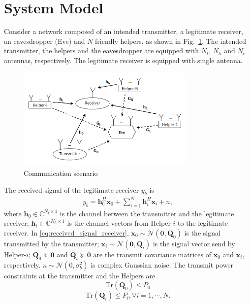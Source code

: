 \documentclass[journal]{IEEEtran}
\begin{document}
\section{System Model} \label{sec:system model}
Consider a network composed of an intended transmitter, a legitimate receiver, an eavesdropper (Eve) and $N$ friendly helpers, as shown in Fig.~\ref{fig:channel}. The intended transmitter, the helpers and the eavesdropper are equipped with $N_t$, $N_h$ and $N_e$ antennas, respectively. The legitimate receiver is equipped with single antenna. 
\begin{figure}[!htbp] 
	\centering
	\includegraphics[width=8.7cm]{channel.png} %
	\caption{Communication scenario}
	\label{fig:channel}
\end{figure}
The received signal of the legitimate receiver $y_b$ is
\begin{eqnarray}
y_b =\mathbf{h}_0^{H}\mathbf{x}_0 + \sum_{i=1}^N \mathbf{h}_{i}^H\mathbf{x}_{i} + n, \label{eq:received_signal_receiver}
\end{eqnarray}
where $\mathbf{h}_0 \in \mathbb{C}^{N_t \times 1}$ is the channel between the transmitter and the legitimate receiver; $\mathbf{h}_i \in \mathbb{C}^{N_h \times 1}$ is the channel vectors from Helper-$i$ to the legitimate receiver. In \eqref{eq:received_signal_receiver}, $\mathbf{x}_0 \sim \mathcal{N}(\mathbf{0}, \mathbf{Q}_0)$ is the signal transmitted by the transmitter; $\mathbf{x}_i \sim \mathcal{N}(\mathbf{0}, \mathbf{Q}_i)$ is the signal vector send by Helper-$i$; $\mathbf{Q}_0 \succeq \mathbf{0}$ and $\mathbf{Q}_i \succeq \mathbf{0}$ are the transmit covariance matrices of $\mathbf{x}_0$ and $\mathbf{x}_i$, respectively. $n \sim \mathcal{N}(0,\sigma_b^2)$ is complex Gaussian noise. The transmit power constraints at the transmitter and the Helpers are
\begin{equation}
\text{Tr}\left(\mathbf{Q}_0\right)\leq P_0
\end{equation} 
\begin{equation}
\text{Tr}\left(\mathbf{Q}_i\right) \leq P_i, \forall i = 1,\cdots,N.
\end{equation}
\end{document}
